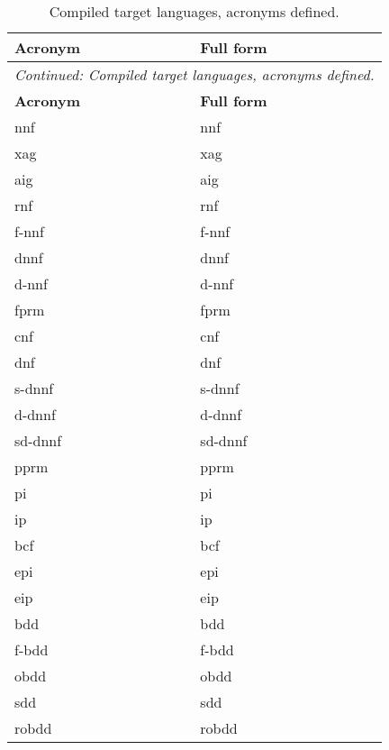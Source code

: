 \begin{longtable}[h!]{ll}
\caption{Compiled target languages, acronyms defined.} \\
\toprule
\textbf{Acronym} & \textbf{Full form} \\
\midrule
\endfirsthead

\multicolumn{2}{c}{\textit{Continued: Compiled target languages, acronyms defined.}} \\
\toprule
\textbf{Acronym} & \textbf{Full form} \\
\midrule
\endhead

\endfoot
\bottomrule
\endlastfoot

\acrshort{nnf}    & \acrlong{nnf}    \\
\acrshort{xag}    & \acrlong{xag}    \\
\acrshort{aig}    & \acrlong{aig}    \\
\acrshort{rnf}    & \acrlong{rnf}    \\
\acrshort{f-nnf}  & \acrlong{f-nnf}  \\
\acrshort{dnnf}   & \acrlong{dnnf}   \\
\acrshort{d-nnf}  & \acrlong{d-nnf}  \\
\acrshort{fprm}   & \acrlong{fprm}   \\
\acrshort{cnf}    & \acrlong{cnf}    \\
\acrshort{dnf}    & \acrlong{dnf}    \\
\acrshort{s-dnnf} & \acrlong{s-dnnf} \\
\acrshort{d-dnnf} & \acrlong{d-dnnf} \\
\acrshort{sd-dnnf} & \acrlong{sd-dnnf} \\
\acrshort{pprm}   & \acrlong{pprm}   \\
\acrshort{pi}     & \acrlong{pi}     \\
\acrshort{ip}     & \acrlong{ip}     \\
\acrshort{bcf}     & \acrlong{bcf}     \\
\acrshort{epi}    & \acrlong{epi}    \\
\acrshort{eip}    & \acrlong{eip}    \\
\acrshort{bdd}    & \acrlong{bdd}    \\
\acrshort{f-bdd}  & \acrlong{f-bdd}  \\
\acrshort{obdd}   & \acrlong{obdd}   \\
\acrshort{sdd}    & \acrlong{sdd}    \\
\acrshort{robdd}  & \acrlong{robdd}  \\
\end{longtable}